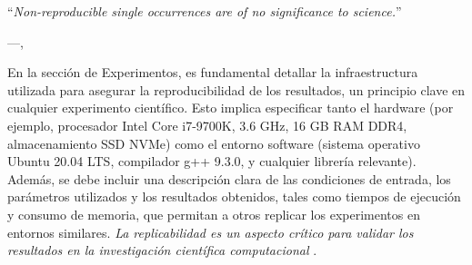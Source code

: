 \epigraph{``\textit{Non-reproducible single occurrences are of no significance to
science.}''}{---\citeauthor{popper2005logic},\citeyear{popper2005logic} \cite{popper2005logic}}
En la sección de Experimentos, es fundamental detallar la infraestructura utilizada para asegurar la reproducibilidad de los resultados, un principio clave en cualquier experimento científico. Esto implica especificar tanto el hardware (por ejemplo, procesador Intel Core i7-9700K, 3.6 GHz, 16 GB RAM DDR4, almacenamiento SSD NVMe) como el entorno software (sistema operativo Ubuntu 20.04 LTS, compilador g++ 9.3.0, y cualquier librería relevante). Además, se debe incluir una descripción clara de las condiciones de entrada, los parámetros utilizados y los resultados obtenidos, tales como tiempos de ejecución y consumo de memoria, que permitan a otros replicar los experimentos en entornos similares. \textit{La replicabilidad es un aspecto crítico para validar los resultados en la investigación científica computacional} \cite{inbookFonseca}.
